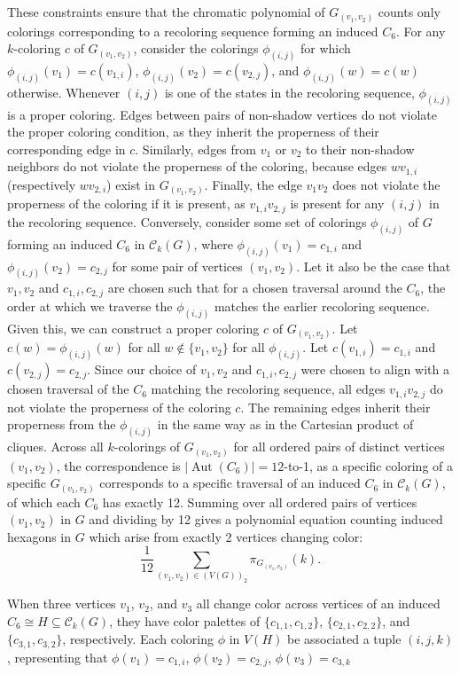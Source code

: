 \documentclass[12pt,reqno,dvipsnames]{amsart}
\theoremstyle{definition}
\begin{document}
These constraints ensure that the chromatic polynomial of $G_{(v_1,v_2)}$ counts only colorings corresponding to a recoloring sequence forming an induced $C_6$. For any $k$-coloring $c$ of $G_{(v_1,v_2)}$, consider the colorings $\phi_{(i,j)}$ for which $\phi_{(i,j)}(v_1)=c(v_{1,i})$, $\phi_{(i,j)}(v_2)=c(v_{2,j})$, and $\phi_{(i,j)}(w)=c(w)$ otherwise. Whenever $(i,j)$ is one of the states in the recoloring sequence, $\phi_{(i,j)}$ is a proper coloring. Edges between pairs of non-shadow vertices do not violate the proper coloring condition, as they inherit the properness of their corresponding edge in $c$. Similarly, edges from $v_1$ or $v_2$ to their non-shadow neighbors do not violate the properness of the coloring, because edges $wv_{1,i}$ (respectively $wv_{2,i}$) exist in $G_{(v_1,v_2)}$. Finally, the edge $v_1v_2$ does not violate the properness of the coloring if it is present, as $v_{1,i}v_{2,j}$ is present for any $(i,j)$ in the recoloring sequence. Conversely, consider some set of colorings $\phi_{(i,j)}$ of $G$ forming an induced $C_6$ in $\mathcal{C}_k(G)$, where $\phi_{(i,j)}(v_1)=c_{1,i}$ and $\phi_{(i,j)}(v_2)=c_{2,j}$ for some pair of vertices $(v_1,v_2)$. Let it also be the case that $v_1,v_2$ and $c_{1,i},c_{2,j}$ are chosen such that for a chosen traversal around the $C_6$, the order at which we traverse the $\phi_{(i,j)}$ matches the earlier recoloring sequence. Given this, we can construct a proper coloring $c$ of $G_{(v_1,v_2)}$. Let $c(w)=\phi_{(i,j)}(w)$ for all $w\notin \{v_1,v_2\}$ for all $\phi_{(i,j)}$. Let $c(v_{1,i})=c_{1,i}$ and $c(v_{2,j})=c_{2,j}$. Since our choice of $v_1,v_2$ and $c_{1,i},c_{2,j}$ were chosen to align with a chosen traversal of the $C_6$ matching the recoloring sequence, all edges $v_{1,i}v_{2,j}$ do not violate the properness of the coloring $c$. The remaining edges inherit their properness from the $\phi_{(i,j)}$ in the same way as in the Cartesian product of cliques. Across all $k$-colorings of $G_{(v_1,v_2)}$ for all ordered pairs of distinct vertices $(v_1,v_2)$, the correspondence is $|\operatorname{Aut}(C_6)| = 12$-to-1, as a specific coloring of a specific $G_{(v_1,v_2)}$ corresponds to a specific traversal of an induced $C_6$ in $\mathcal{C}_k(G)$, of which each $C_6$ has exactly 12. Summing over all ordered pairs of vertices $(v_1, v_2)$ in $G$ and dividing by 12 gives a polynomial equation counting induced hexagons in $G$ which arise from exactly 2 vertices changing color:
$$
\frac{1}{12} \sum_{(v_1,v_2) \in (V(G))_2} \pi_{G_{(v_1,v_2)}}(k).
$$

When three vertices $v_1$, $v_2$, and $v_3$ all change color across vertices of an induced $C_6\cong H \subseteq \mathcal{C}_k(G)$, they have color palettes of $\{c_{1,1},c_{1,2}\}$, $\{c_{2,1},c_{2,2}\}$, and $\{c_{3,1},c_{3,2}\}$, respectively. Each coloring $\phi$ in $V(H)$ be associated a tuple $(i, j, k)$, representing that $\phi(v_1)=c_{1,i}$, $\phi(v_2)=c_{2,j}$, $\phi(v_3)=c_{3,k}$
\end{document}
